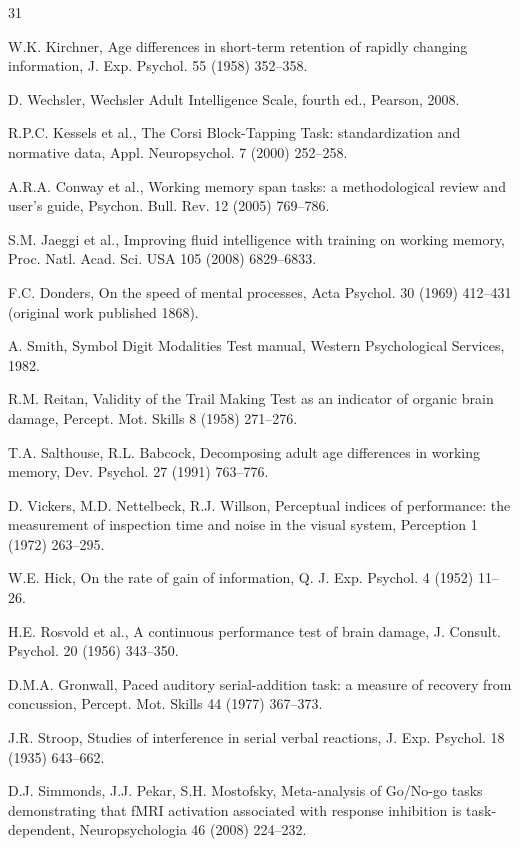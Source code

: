 \documentclass[11pt,a4paper]{article}
\begin{document}
\begin{thebibliography}{31}

W.K. Kirchner,
Age differences in short-term retention of rapidly changing information,
J. Exp. Psychol. 55 (1958) 352--358.

D. Wechsler,
Wechsler Adult Intelligence Scale,
fourth ed., Pearson, 2008.

R.P.C. Kessels et al.,
The Corsi Block-Tapping Task: standardization and normative data,
Appl. Neuropsychol. 7 (2000) 252--258.

A.R.A. Conway et al.,
Working memory span tasks: a methodological review and user's guide,
Psychon. Bull. Rev. 12 (2005) 769--786.

S.M. Jaeggi et al.,
Improving fluid intelligence with training on working memory,
Proc. Natl. Acad. Sci. USA 105 (2008) 6829--6833.

F.C. Donders,
On the speed of mental processes,
Acta Psychol. 30 (1969) 412--431
(original work published 1868).

A. Smith,
Symbol Digit Modalities Test manual,
Western Psychological Services, 1982.

R.M. Reitan,
Validity of the Trail Making Test as an indicator of organic brain damage,
Percept. Mot. Skills 8 (1958) 271--276.

T.A. Salthouse, R.L. Babcock,
Decomposing adult age differences in working memory,
Dev. Psychol. 27 (1991) 763--776.

D. Vickers, M.D. Nettelbeck, R.J. Willson,
Perceptual indices of performance: the measurement of inspection time and
noise in the visual system,
Perception 1 (1972) 263--295.

W.E. Hick,
On the rate of gain of information,
Q. J. Exp. Psychol. 4 (1952) 11--26.

H.E. Rosvold et al.,
A continuous performance test of brain damage,
J. Consult. Psychol. 20 (1956) 343--350.

D.M.A. Gronwall,
Paced auditory serial-addition task: a measure of recovery from concussion,
Percept. Mot. Skills 44 (1977) 367--373.

J.R. Stroop,
Studies of interference in serial verbal reactions,
J. Exp. Psychol. 18 (1935) 643--662.

D.J. Simmonds, J.J. Pekar, S.H. Mostofsky,
Meta-analysis of Go/No-go tasks demonstrating that fMRI activation
associated with response inhibition is task-dependent,
Neuropsychologia 46 (2008) 224--232.


\end{thebibliography}
\end{document}
